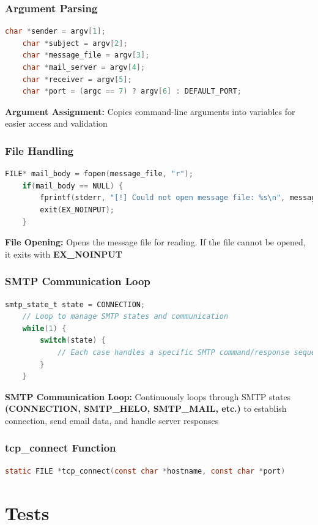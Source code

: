 \documentclass[12pt,a4paper]{article}
\begin{document}
    \subsubsection{Argument Parsing}
    \begin{lstlisting}[language=C]
    char *sender = argv[1];
    char *subject = argv[2];
    char *message_file = argv[3];
    char *mail_server = argv[4];
    char *receiver = argv[5];
    char *port = (argc == 7) ? argv[6] : DEFAULT_PORT;
    \end{lstlisting}
    \textbf{Argument Assignment:} Copies command-line arguments into variables for easier access and validation

    \subsubsection{File Handling}
    \begin{lstlisting}[language=C]
    FILE* mail_body = fopen(message_file, "r");
    if(mail_body == NULL) {
        fprintf(stderr, "[!] Could not open message file: %s\n", message_file);
        exit(EX_NOINPUT);
    }
    \end{lstlisting}
    \textbf{File Opening:} Opens the message file for reading. If the file cannot be opened, it exits with \textbf{EX\_NOINPUT}

    \subsubsection{SMTP Communication Loop}
    \begin{lstlisting}[language=C]
    smtp_state_t state = CONNECTION;
    // Loop to manage SMTP states and communication
    while(1) {
        switch(state) {
            // Each case handles a specific SMTP command/response sequence
        }
    }
    \end{lstlisting}
    \textbf{SMTP Communication Loop:} Continuously loops through SMTP states \textbf{(CONNECTION, SMTP\_HELO, SMTP\_MAIL, etc.)} to establish connection, send email data, and handle server responses

    \subsubsection{tcp\_connect Function}
    \begin{lstlisting}[language=C]
    static FILE *tcp_connect(const char *hostname, const char *port)
    \end{lstlisting}
    
    \section{Tests}
\end{document}
